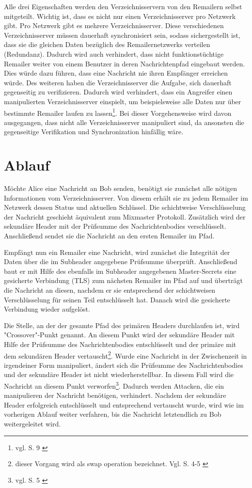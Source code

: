 Alle drei Eigenschaften werden den Verzeichnisservern von den Remailern selbst mitgeteilt.
Wichtig ist, dass es nicht nur einen Verzeichnisserver pro Netzwerk gibt. Pro Netzwerk gibt es mehrere Verzeichnisserver. Diese verschiedenen Verzeichnisserver müssen dauerhaft synchronisiert sein, sodass sichergestellt ist, dass sie die gleichen Daten bezüglich des Remailernetzwerks verteilen (Redundanz). Dadurch wird auch verhindert, dass nicht funktionstüchtige Remailer weiter von einem Benutzer in deren Nachrichtenpfad eingebaut werden. Dies würde dazu führen, dass eine Nachricht nie ihren Empfänger erreichen würde. Des weiteren haben die Verzeichnisserver die Aufgabe, sich dauerhaft gegenseitig zu verifizieren. Dadurch wird verhindert, dass ein Angreifer einen manipulierten Verzeichnisserver einspielt, um beispielsweise alle Daten nur über bestimmte Remailer laufen zu lassen\footnote{vgl. S. 9 \cite{mixminion}}. Bei dieser Vorgehensweise wird davon ausgegangen, dass nicht alle Verzeichnisserver manipuliert sind, da ansonsten die gegenseitige Verifikation und Synchronization hinfällig wäre.

\section{Ablauf}
Möchte Alice eine Nachricht an Bob senden, benötigt sie zunächst alle nötigen Informationen vom Verzeichnisserver. Von diesem erhält sie zu jedem Remailer im Netzwerk dessen Status und aktuellen Schlüssel. Die schichtweise Verschlüsselung der Nachricht geschieht äquivalent zum Mixmaster Protokoll. Zusätzlich wird der sekundäre Header mit der Prüfsumme des Nachrichtenbodies verschlüsselt.
Anschließend sendet sie die Nachricht an den ersten Remailer im Pfad.

Empfängt nun ein Remailer eine Nachricht, wird zunächst die Integrität der Daten über die im Subheader angegebene Prüfsumme überprüft. Anschließend baut er mit Hilfe des ebenfalls im Subheader angegebenen Master-Secrets eine gesicherte Verbindung (TLS) zum nächsten Remailer im Pfad auf und überträgt die Nachricht an diesen, nachdem er sie entsprechend der schichtweisen Verschlüsselung für seinen Teil entschlüsselt hat. Danach wird die gesicherte Verbindung wieder aufgelöst.

Die Stelle, an der der gesamte Pfad des primären Headers durchlaufen ist, wird "Crossover"-Punkt genannt. An diesem Punkt wird der sekundäre Header mit Hilfe der Prüfsumme des Nachrichtenbodies entschlüsselt und der primäre mit dem sekundären Header vertauscht\footnote{dieser Vorgang wird als swap operation bezeichnet. Vgl. S. 4-5 \cite{mixminion}}. Wurde eine Nachricht in der Zwischenzeit in irgendeiner Form manipuliert, ändert sich die Prüfsumme des Nachrichtenbodies und der sekundäre Header ist nicht wiederherstellbar. In diesem Fall wird die Nachricht an diesem Punkt verworfen\footnote{vgl. S. 5 \cite{mixminion}}. Dadurch werden Attacken, die ein manipulieren der Nachricht benötigen, verhindert. Nachdem der sekundäre Header erfolgreich entschlüsselt und entsprechend vertauscht wurde, wird wie im vorherigen Ablauf weiter verfahren, bis die Nachricht letztendlich zu Bob weitergeleitet wird. 

